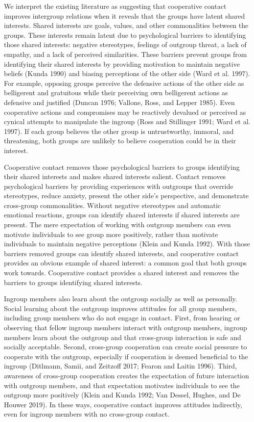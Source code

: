 \documentclass[11pt]{article}
\begin{document}
We interpret the existing literature as suggesting that cooperative
contact improves intergroup relations when it reveals that the groups
have latent shared interests. Shared interests are goals, values, and
other commonalities between the groups. These interests remain latent
due to psychological barriers to identifying those shared interests:
negative stereotypes, feelings of outgroup threat, a lack of empathy,
and a lack of perceived similarities. These barriers prevent groups from
identifying their shared interests by providing motivation to maintain
negative beliefs (Kunda 1990) and biasing perceptions of the other side
(Ward et al. 1997). For example, opposing groups perceive the defensive
actions of the other side as belligerent and gratuitous while their
perceiving own belligerent actions as defensive and justified (Duncan
1976; Vallone, Ross, and Lepper 1985). Even cooperative actions and
compromises may be reactively devalued or perceived as cynical attempts
to manipulate the ingroup (Ross and Stillinger 1991; Ward et al. 1997).
If each group believes the other group is untrustworthy, immoral, and
threatening, both groups are unlikely to believe cooperation could be in
their interest.

Cooperative contact removes those psychological barriers to groups
identifying their shared interests and makes shared interests salient.
Contact removes psychological barriers by providing experiences with
outgroups that override stereotypes, reduce anxiety, present the other
side's perspective, and demonstrate cross-group commonalities. Without
negative stereotypes and automatic emotional reactions, groups can
identify shared interests if shared interests are present. The mere
expectation of working with outgroup members can even motivate
individuals to see group more positively, rather than motivate
individuals to maintain negative perceptions (Klein and Kunda 1992).
With those barriers removed groups can identify shared interests, and
cooperative contact provides an obvious example of shared interest: a
common goal that both groups work towards. Cooperative contact provides
a shared interest and removes the barriers to groups identifying shared
interests.

Ingroup members also learn about the outgroup socially as well as
personally. Social learning about the outgroup improves attitudes for
all group members, including group members who do not engage in contact.
First, from hearing or observing that fellow ingroup members interact
with outgroup members, ingroup members learn about the outgroup and that
cross-group interaction is safe and socially acceptable. Second,
cross-group cooperation can create social pressure to cooperate with the
outgroup, especially if cooperation is deemed beneficial to the ingroup
(Ditlmann, Samii, and Zeitzoff 2017; Fearon and Laitin 1996). Third,
awareness of cross-group cooperation creates the expectation of future
interaction with outgroup members, and that expectation motivates
individuals to see the outgroup more positively (Klein and Kunda 1992;
Van Dessel, Hughes, and De Houwer 2019). In these ways, cooperative
contact improves attitudes indirectly, even for ingroup members with no
cross-group contact.
\end{document}
